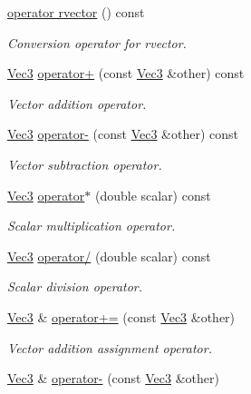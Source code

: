 \begin{DoxyCompactItemize}
\hyperlink{structcubesat_1_1Vec3_a23859048647c86ff4a27d58b8ca9567e}{operator rvector} () const
\begin{DoxyCompactList}\small\item\em Conversion operator for rvector. \end{DoxyCompactList}\item 
\hyperlink{structcubesat_1_1Vec3}{Vec3} \hyperlink{structcubesat_1_1Vec3_aec51beef99ddbe4e9cab0f0cb57ec21e}{operator+} (const \hyperlink{structcubesat_1_1Vec3}{Vec3} \&other) const
\begin{DoxyCompactList}\small\item\em Vector addition operator. \end{DoxyCompactList}\item 
\hyperlink{structcubesat_1_1Vec3}{Vec3} \hyperlink{structcubesat_1_1Vec3_ac4773756711cdd4229a0bcf48c6203f5}{operator-\/} (const \hyperlink{structcubesat_1_1Vec3}{Vec3} \&other) const
\begin{DoxyCompactList}\small\item\em Vector subtraction operator. \end{DoxyCompactList}\item 
\hyperlink{structcubesat_1_1Vec3}{Vec3} \hyperlink{structcubesat_1_1Vec3_af9b00c2ed0c783963023e4ceba5b1e1c}{operator$\ast$} (double scalar) const
\begin{DoxyCompactList}\small\item\em Scalar multiplication operator. \end{DoxyCompactList}\item 
\hyperlink{structcubesat_1_1Vec3}{Vec3} \hyperlink{structcubesat_1_1Vec3_a5fe9b0fabe439775202c015e34b0557b}{operator/} (double scalar) const
\begin{DoxyCompactList}\small\item\em Scalar division operator. \end{DoxyCompactList}\item 
\hyperlink{structcubesat_1_1Vec3}{Vec3} \& \hyperlink{structcubesat_1_1Vec3_a6ceb16c57812d7e5185a9bd1f141aa5c}{operator+=} (const \hyperlink{structcubesat_1_1Vec3}{Vec3} \&other)
\begin{DoxyCompactList}\small\item\em Vector addition assignment operator. \end{DoxyCompactList}\item 
\hyperlink{structcubesat_1_1Vec3}{Vec3} \& \hyperlink{structcubesat_1_1Vec3_ac50053dd4f3112bd1e9028dd10d67305}{operator-\/} (const \hyperlink{structcubesat_1_1Vec3}{Vec3} \&other)

\end{DoxyCompactItemize}

